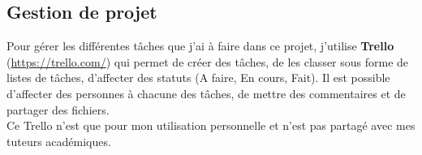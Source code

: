 \documentclass[overfullbox, poster]{polytech/polytech}
\begin{document}
\subsection{Gestion de projet}
Pour gérer les différentes tâches que j'ai à faire dans ce projet, j'utilise \textbf{Trello} (\url{https://trello.com/}) qui permet de créer des tâches, de les classer sous forme de listes de tâches, d'affecter des statuts (A faire, En cours, Fait). Il est possible d'affecter des personnes à chacune des tâches, de mettre des commentaires et de partager des fichiers.\\
Ce Trello n'est que pour mon utilisation personnelle et n'est pas partagé avec mes tuteurs académiques.






\appendix
\end{document}
